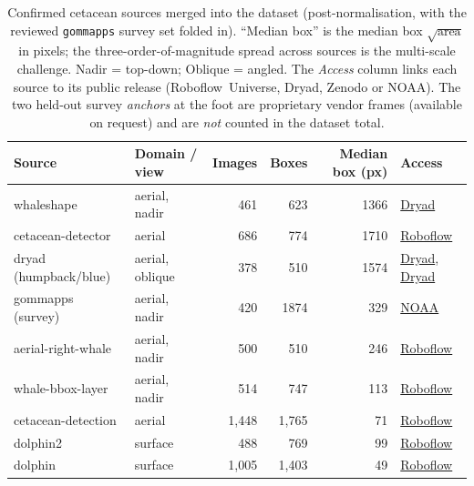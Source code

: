 \documentclass[11pt,a4paper]{article}
\begin{document}
\begin{table}[t]
\centering
\caption{Confirmed cetacean sources merged into the dataset (post-normalisation,
with the reviewed \texttt{gommapps} survey set folded in). ``Median box''
is the median box $\sqrt{\text{area}}$ in pixels; the three-order-of-magnitude
spread across sources is the multi-scale challenge. Nadir = top-down; Oblique =
angled. The \emph{Access} column links each source to its public release
(Roboflow~Universe, Dryad, Zenodo or NOAA). The two
held-out survey \emph{anchors} at the foot are proprietary vendor frames
(available on request) and are \emph{not} counted in the dataset total.}
\label{tab:sources}
\small
\setlength{\tabcolsep}{4pt}
\begin{tabular}{llrrrl}
\toprule
Source & Domain / view & Images & Boxes & Median box (px) & Access \\
\midrule
whaleshape           & aerial, nadir   & 461    & 623    & 1366 & \href{https://datadryad.org/share/n6Z_18PGx5Fji97H3opNqfZ8KHODa93G9-JmHojEc4A}{Dryad} \\
cetacean-detector    & aerial          & 686    & 774    & 1710 & \href{https://universe.roboflow.com/whalecrop/cetacean-detector}{Roboflow} \\
dryad (humpback/blue)& aerial, oblique & 378    & 510    & 1574 & \href{https://doi.org/10.5061/dryad.6q573n668}{Dryad}, \href{https://doi.org/10.5061/dryad.7482v2n}{Dryad} \\
gommapps (survey)    & aerial, nadir   & 420    & 1874   & 329  & \href{https://www.ncei.noaa.gov/archive/accession/0243469}{NOAA} \\
aerial-right-whale   & aerial, nadir   & 500    & 510    & 246  & \href{https://universe.roboflow.com/whale-detect/aerial-right-whale-detection}{Roboflow} \\
whale-bbox-layer     & aerial, nadir   & 514    & 747    & 113  & \href{https://universe.roboflow.com/whaleproject/whale-bbox-layer-ehkgx}{Roboflow} \\
cetacean-detection   & aerial          & 1{,}448 & 1{,}765 & 71  & \href{https://universe.roboflow.com/1-rfjla/cetacean-detection}{Roboflow} \\
dolphin2             & surface         & 488    & 769    & 99   & \href{https://universe.roboflow.com/nycuproject/dolphin-llvnv}{Roboflow} \\
dolphin              & surface         & 1{,}005 & 1{,}403 & 49  & \href{https://universe.roboflow.com/sysu-pc6gg/dolphin-i6izz}{Roboflow} \\

\end{tabular}
\end{table}
\end{document}
